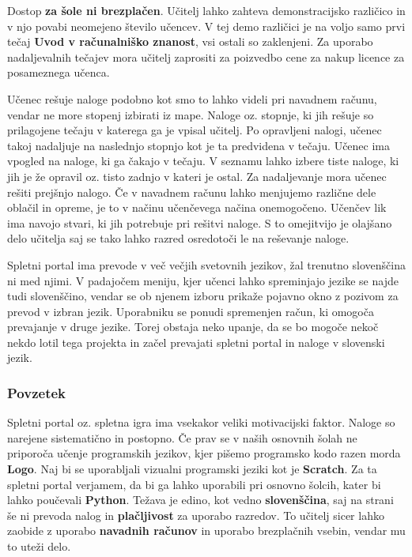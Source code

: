 Dostop \textbf{za šole ni brezplačen}. Učitelj lahko zahteva
demonstracijsko različico in v njo povabi neomejeno število učencev. V
tej demo različici je na voljo samo prvi tečaj \textbf{Uvod v
  računalniško znanost}, vsi ostali so zaklenjeni. Za uporabo
nadaljevalnih tečajev mora učitelj zaprositi za poizvedbo cene za nakup
licence za posameznega učenca.

Učenec rešuje naloge podobno kot smo to lahko videli pri navadnem
računu, vendar ne more stopenj izbirati iz mape. Naloge oz. stopnje,
ki jih rešuje so prilagojene tečaju v katerega ga je vpisal
učitelj. Po opravljeni nalogi, učenec takoj nadaljuje na naslednjo
stopnjo kot je ta predvidena v tečaju. Učenec ima vpogled na naloge,
ki ga čakajo v tečaju. V seznamu lahko izbere tiste naloge, ki jih je
že opravil oz. tisto zadnjo v kateri je ostal. Za nadaljevanje mora
učenec rešiti prejšnjo nalogo. Če v navadnem računu lahko menjujemo
različne dele oblačil in opreme, je to v načinu učenčevega načina
onemogočeno. Učenčev lik ima navojo stvari, ki jih potrebuje pri
rešitvi naloge. S to omejitvijo je olajšano delo učitelja saj se tako
lahko razred osredotoči le na reševanje naloge.


 Spletni portal ima prevode v več večjih svetovnih jezikov, žal
 trenutno slovenščina ni med njimi. V padajočem meniju, kjer učenci
 lahko spreminjajo jezike se najde tudi slovenščino, vendar se ob
 njenem izboru prikaže pojavno okno z pozivom za prevod v izbran
 jezik. Uporabniku se ponudi spremenjen račun, ki omogoča prevajanje v
 druge jezike. Torej obstaja neko upanje, da se bo mogoče nekoč nekdo
 lotil tega projekta in začel prevajati spletni portal in naloge v
 slovenski jezik. 

\subsubsection{Povzetek}
\label{sec:povzetek:codincombat}

Spletni portal oz. spletna igra ima vsekakor veliki motivacijski
faktor. Naloge so narejene sistematično in postopno. Če prav se v
naših osnovnih šolah ne priporoča učenje programskih jezikov, kjer
pišemo programsko kodo razen morda \textbf{Logo}. Naj bi se
uporabljali vizualni programski jeziki kot je \textbf{Scratch}. Za ta
spletni portal verjamem, da bi ga lahko uporabili pri osnovno šolcih,
kater bi lahko poučevali \textbf{Python}. Težava je edino, kot vedno
\textbf{slovenščina}, saj na strani še ni prevoda nalog in
\textbf{plačljivost} za uporabo razredov. To učitelj sicer lahko
zaobide z uporabo \textbf{navadnih računov} in uporabo brezplačnih
vsebin, vendar mu to uteži delo. 

